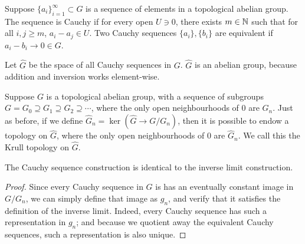 \begin{definition}
    Suppose \({\{a_i\}}_{i=1}^\infty \subset G\) is a sequence of elements in a topological abelian group.
    The sequence is Cauchy if for every open \(U \ni 0\),
    there exists \(m \in \mathbb{N}\) such that for all \(i,j \geq m\), \(a_i - a_j \in U\).
    Two Cauchy sequences \(\{a_i\},\{b_i\}\) are equivalent if \(a_i - b_i \to 0 \in G\).
\end{definition}
\begin{definition}
    Let \(\hat{G}\) be the space of all Cauchy sequences in \(G\).
    \(\hat{G}\) is an abelian group, because addition and inversion works element-wise.
\end{definition}
\begin{definition}
    Suppose \(G\) is a topological abelian group,
    with a sequence of subgroups \(G = G_0 \supseteq G_1 \supseteq G_2 \supseteq \cdots\),
    where the only open neighbourhoods of 0 are \(G_n\).
    Just as before, if we define \(\hat{G}_n = \ker(\hat{G} \to G/G_n)\),
    then it is possible to endow a topology on \(\hat{G}\),
    where the only open neighbourhoods of 0 are \(\hat{G}_n\).
    We call this the Krull topology on \(\hat{G}\).
\end{definition}
\begin{proposition}
    The Cauchy sequence construction is identical to the inverse limit construction.
\end{proposition}
\begin{proof}
    Since every Cauchy sequence in \(G\) is has an eventually constant image in \(G/G_n\),
    we can simply define that image as \(g_n\),
    and verify that it satisfies the definition of the inverse limit.
    Indeed, every Cauchy sequence has such a representation in \(g_n\);
    and because we quotient away the equivalent Cauchy sequences,
    such a representation is also unique.
\end{proof}


